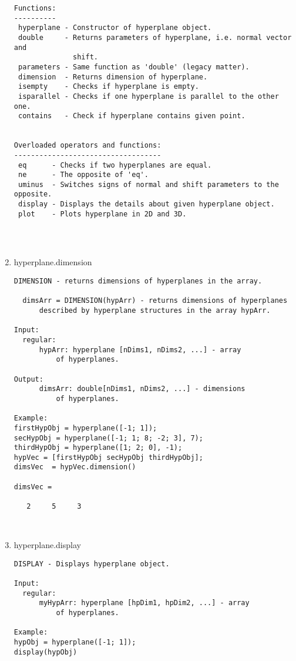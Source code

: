 \begin{enumerate}
\begin{lstlisting}
Functions:
----------
 hyperplane - Constructor of hyperplane object.
 double     - Returns parameters of hyperplane, i.e. normal vector and
              shift.
 parameters - Same function as 'double' (legacy matter).
 dimension  - Returns dimension of hyperplane.
 isempty    - Checks if hyperplane is empty.
 isparallel - Checks if one hyperplane is parallel to the other one.
 contains   - Check if hyperplane contains given point.


Overloaded operators and functions:
-----------------------------------
 eq      - Checks if two hyperplanes are equal.
 ne      - The opposite of 'eq'.
 uminus  - Switches signs of normal and shift parameters to the opposite.
 display - Displays the details about given hyperplane object.
 plot    - Plots hyperplane in 2D and 3D.




\end{lstlisting}
\fontfamily{\familydefault}
\selectfont
\item {hyperplane.dimension}
\selectfont
\begin{lstlisting}
DIMENSION - returns dimensions of hyperplanes in the array.

  dimsArr = DIMENSION(hypArr) - returns dimensions of hyperplanes
      described by hyperplane structures in the array hypArr.

Input:
  regular:
      hypArr: hyperplane [nDims1, nDims2, ...] - array
          of hyperplanes.

Output:
      dimsArr: double[nDims1, nDims2, ...] - dimensions
          of hyperplanes.

Example:
firstHypObj = hyperplane([-1; 1]);
secHypObj = hyperplane([-1; 1; 8; -2; 3], 7);
thirdHypObj = hyperplane([1; 2; 0], -1);
hypVec = [firstHypObj secHypObj thirdHypObj];
dimsVec  = hypVec.dimension()

dimsVec =

   2     5     3



\end{lstlisting}
\fontfamily{\familydefault}
\selectfont
\item {hyperplane.display}
\selectfont
\begin{lstlisting}
DISPLAY - Displays hyperplane object.

Input:
  regular:
      myHypArr: hyperplane [hpDim1, hpDim2, ...] - array
          of hyperplanes.

Example:
hypObj = hyperplane([-1; 1]);
display(hypObj)


\end{lstlisting}
\end{enumerate}
